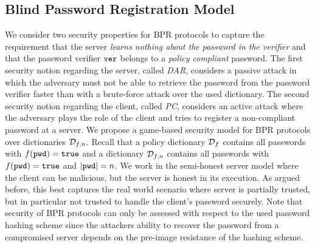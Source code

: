 \subsection{Blind Password Registration Model} \label{sec:bpr-model}
We consider two security properties for \ac{BPR} protocols to capture the requirement that the server \emph{learns nothing about the password in the verifier} and that the password verifier $\mathtt{ver}$ belongs to a \emph{policy compliant} password.
The first security notion regarding the server, called \emph{\ac{DAR}}, considers a passive attack in which the adversary must not be able to retrieve the password from the password verifier faster than with a brute-force attack over the used dictionary.
The second security notion regarding the client, called \emph{\ac{PC}}, considers an active attack where the adversary plays the role of the client and tries to register a non-compliant password at a server.
We propose a game-based security model for \ac{BPR} protocols over dictionaries $\mathcal{D}_{f,n}$.
Recall that a policy dictionary $\mathcal{D}_f$ contains all passwords \pwd with $f(\mathtt{pwd})=\mathtt{true}$ and a dictionary $\mathcal{D}_{f,n}$ contains all passwords \pwd with $f(\mathtt{pwd})=\mathtt{true}$ and $|\mathtt{pwd}|=n$.
We work in the semi-honest server model where the client can be malicious, but the server is honest in its execution.
As argued before, this best captures the real world scenario where server \Server is partially trusted, but in particular not trusted to handle the client's password securely.
Note that security of \ac{BPR} protocols can only be assessed with respect to the used password hashing scheme \HashP since the attackers ability to recover the password from a compromised server depends on the pre-image resistance of the hashing scheme.

